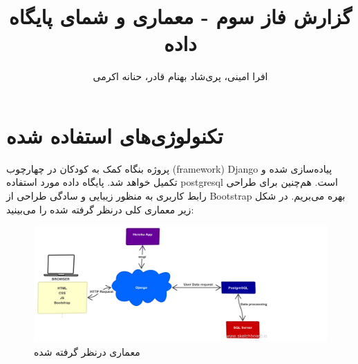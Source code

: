 \documentclass[11pt]{article}
\begin{document}
	\author{\textcolor{mauve}{افرا امینی، پری‌شاد بهنام قادر، حنانه اکرمی}}
	\title{گزارش فاز سوم - معماری و شمای پایگاه داده}
	\maketitle
	\section{تکنولوژی‌های استفاده شده}
	پروژه بنگاه کمک به کودکان در چهارچوب (framework) Django پیاده‌سازی شده و تکمیل خواهد شد. پایگاه داده مورد استفاده postgresql است. هم‌چنین برای طراحی رابط کاربری به منظور زیبایی و سادگی طراحی از Bootstrap بهره می‌بریم. در شکل زیر معماری کلی درنظر گرفته شده را می‌بینید:
	\begin{figure}[H]
	\centering
	\includegraphics[width=15 cm]{memari}
	\caption{معماری درنظر گرفته شده}
	\end{figure}	
\end{document}
